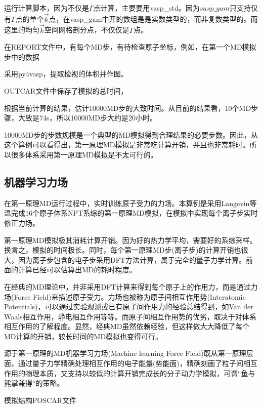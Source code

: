 运行计算脚本，因为不仅是$\Gamma$点计算，主要要用\textrm{vasp\_std}。因为$vasp\_gam$只支持仅有$\Gamma$点的单个$\vec k$点，在\textrm{vasp\_gam}中开的数组是是实数类型的，而非复数类型的。而这里的均匀$\vec k$空间网格剖分点，不仅仅是$\Gamma$点。

在\textrm{REPORT}文件中，有每个\textrm{MD}步，有待检查原子坐标，例如，在第一个\textrm{MD}模拟步中的数据

采用\textrm{py4vasp}，提取检视的体积并作图。

\textrm{OUTCAR}文件中保存了模拟的总时间，

根据当前计算的结果，估计10000\textrm{MD}步的大致时间。从目前的结果看，10个\textrm{MD}步骤，大致是\textrm{74s}，所以10000\textrm{MD}步大约是{20}小时。

10000\textrm{MD}步的步数规模是一个典型的\textrm{MD}模拟得到合理结果的必要步数。因此，从这个算例可以看得出，第一原理\textrm{MD}模拟是非常吃计算开销，并且也非常耗时。所以很多体系采用第一原理\textrm{MD}模拟是不太可行的。

\subsection{机器学习力场}
在第一原理\textrm{MD}运行过程中，实时训练原子受力的力场。本算例是采用\textrm{Langevin}等温完成16个原子体系\textrm{NPT}系综的第一原理\textrm{MD}模拟，在模拟中实现每个离子步实时修正力场。

第一原理\textrm{MD}模拟极其消耗计算开销。因为好的热力学平均，需要好的系综采样。换言之，模拟的时间极长。同时，每个第一原理\textrm{MD}步(离子步)的计算开销也很大，因为离子步包含的电子步采用\textrm{DFT}方法计算，属于完全的量子力学计算。前面的计算已经可以估算出\textrm{MD}的耗时程度。

在经典的\textrm{MD}理论中，并非采用\textrm{DFT}计算来得到每个原子上的作用力，而是通过力场\textrm{(Force Field)}来描述原子受力。力场也被称为原子间相互作用势\textrm{(Interatomic Potentials)}，可以通过实验观测或已有原子间作用力的经验总结得到，如\textrm{Van der Waals}相互作用，静电相互作用等等。而原子间相互作用势的优劣，取决于对体系相互作用的了解程度。显然，经典\textrm{MD}虽然依赖经验，但这样做大大降低了每个\textrm{MD}计算的开销，较长时间的\textrm{MD}模拟也变得可行。

源于第一原理的\textrm{MD}机器学习力场\textrm{(Machine learning Force Field)}既从第一原理层面，通过量子力学精确处理相互作用的电子能量(势能面)，精确刻画了粒子间相互作用的物理本质，又支持以较低的计算开销完成长的分子动力学模拟，可谓``鱼与熊掌兼得''的策略。

模拟结构\textrm{POSCAR}文件

